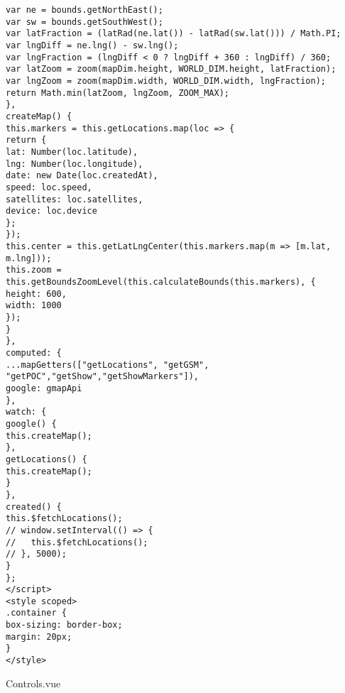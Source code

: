 \begin{lstlisting}
var ne = bounds.getNorthEast();
var sw = bounds.getSouthWest();
var latFraction = (latRad(ne.lat()) - latRad(sw.lat())) / Math.PI;
var lngDiff = ne.lng() - sw.lng();
var lngFraction = (lngDiff < 0 ? lngDiff + 360 : lngDiff) / 360;
var latZoom = zoom(mapDim.height, WORLD_DIM.height, latFraction);
var lngZoom = zoom(mapDim.width, WORLD_DIM.width, lngFraction);
return Math.min(latZoom, lngZoom, ZOOM_MAX);
},
createMap() {
this.markers = this.getLocations.map(loc => {
return {
lat: Number(loc.latitude),
lng: Number(loc.longitude),
date: new Date(loc.createdAt),
speed: loc.speed,
satellites: loc.satellites,
device: loc.device
};
});
this.center = this.getLatLngCenter(this.markers.map(m => [m.lat, m.lng]));
this.zoom = this.getBoundsZoomLevel(this.calculateBounds(this.markers), {
height: 600,
width: 1000
});
}
},
computed: {
...mapGetters(["getLocations", "getGSM", "getPOC","getShow","getShowMarkers"]),
google: gmapApi
},
watch: {
google() {
this.createMap();
},
getLocations() {
this.createMap();
}
},
created() {
this.$fetchLocations();
// window.setInterval(() => {
//   this.$fetchLocations();
// }, 5000);
}
};
</script>
<style scoped>
.container {
box-sizing: border-box;
margin: 20px;
}
</style>
\end{lstlisting}
Controls.vue
